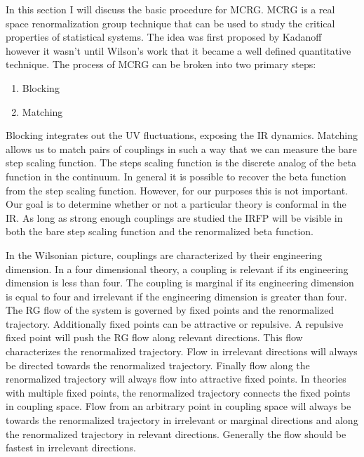 
In this section I will discuss the basic procedure for MCRG.
MCRG is a real space renormalization group technique that can be used to study the critical properties of statistical systems.
The idea was first proposed by Kadanoff however it wasn't until Wilson's work that it became a well defined quantitative technique.
The process of MCRG can be broken into two primary steps:
\begin{enumerate}
  \item Blocking
  \item Matching
\end{enumerate}
Blocking integrates out the UV fluctuations, exposing the IR dynamics.
Matching allows us to match pairs of couplings in such a way that we can measure the bare step scaling function.
The steps scaling function is the discrete analog of the beta function in the continuum.
In general it is possible to recover the beta function from the step scaling function.
However, for our purposes this is not important.
Our goal is to determine whether or not a particular theory is conformal in the IR.
As long as strong enough couplings are studied the IRFP will be visible in both the bare step scaling function and the renormalized beta function.

In the Wilsonian picture, couplings are characterized by their engineering dimension.
In a four dimensional theory, a coupling is relevant if its engineering dimension is less than four.
The coupling is marginal if its engineering dimension is equal to four and irrelevant if the engineering dimension is greater than four.
The RG flow of the system is governed by fixed points and the renormalized trajectory.
Additionally fixed points can be attractive or repulsive.
A repulsive fixed point will push the RG flow along relevant directions.
This flow characterizes the renormalized trajectory.
Flow in irrelevant directions will always be directed towards the renormalized trajectory.
Finally flow along the renormalized trajectory will always flow into attractive fixed points.
In theories with multiple fixed points, the renormalized trajectory connects the fixed points in coupling space.
Flow from an arbitrary point in coupling space will always be towards the renormalized trajectory in irrelevant or marginal directions and along the renormalized trajectory in relevant directions.
Generally the flow should be fastest in irrelevant directions.

